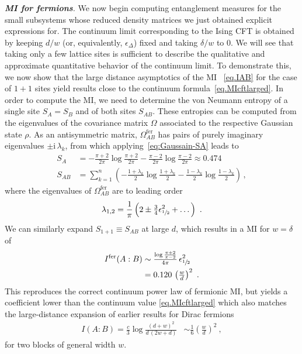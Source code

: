 \documentclass[prl,a4paper,notitlepage,twocolumn,superscriptaddress,longbibliography,reprint]{revtex4-2}
\newcommand{\ii}{\mathrm{i}}
\newcommand{\mysection}[1]{{\vspace{10 pt}\noindent \emph{{\textbf{#1}}.}}}
\begin{document}
\mysection{MI for fermions}
We now begin computing entanglement measures for the small subsystems whose reduced density matrices we just obtained explicit expressions for.
The continuum limit corresponding to the Ising CFT is obtained by keeping $d/w$ (or, equivalently, $\epsilon_\Delta$) fixed and taking $\delta/w$ to $0$. We will see that taking only a few lattice sites is sufficient to describe the qualitative and approximate quantitative behavior of the continuum limit.
To demonstrate this, we now show that the large distance asymptotics of the MI ~\eqref{eq.IAB} for the case of $1+1$ sites yield results close to the continuum formula~\eqref{eq.MIcftlarged}. 
In order to compute the MI, we need to determine the von Neumann entropy of a single site $S_A=S_B$ and of both sites $S_{AB}$. These entropies can be computed from the eigenvalues of the covariance matrix $\Omega$ associated to the respective Gaussian state $\rho$. As an antisymmetric matrix, $\Omega^{\mathrm{fer}}_{AB}$  has pairs of purely imaginary eigenvalues $\pm \ii\, \lambda_k$, from which applying~\eqref{eq:Gaussain-SA} leads to
\begin{align}
S_A&=- \tfrac{\pi+2}{2\pi}\log\tfrac{\pi+2}{2\pi} - \tfrac{\pi-2}{2\pi}\log\tfrac{\pi-2}{2\pi} \approx 0.474\\
    S_{AB} &=\sum_{k=1}^n \left( - \tfrac{1+\lambda_k}{2}\log\tfrac{1+\lambda_k}{2} - \tfrac{1-\lambda_k}{2}\log\tfrac{1-\lambda_k}{2} \right)\,,\label{eq:Gaussian-SAB}
\end{align}
where the eigenvalues of $\Omega_{AB}^{\mathrm{fer}}$ are to leading order
\begin{equation}
    \lambda_{1,2} = \frac{1}{\pi} \left( 2 \pm \tfrac{3}{4}\epsilon_{\sfrac{1}{2}}^2  + \dots \right) \ . 
\end{equation}
We can similarly expand $S_{1+1} \equiv S_{AB}$ at large $d$, which results in a MI for $w=\delta$ of
\begin{align}\label{eq:MIFerm11}
    I^{\mathrm{fer}}(A:B)&\sim \tfrac{\log\frac{\pi+2}{\pi-2}}{4\pi}\,\epsilon_{\sfrac{1}{2}}^2 \nonumber\\
    &= 0.120 \,\left(\tfrac{w}{d}\right)^2 \ .
\end{align}
This reproduces the correct continuum power law of fermionic MI, but yields a coefficient lower than the continuum value \eqref{eq.MIcftlarged} which also matches the large-distance expansion of earlier results for Dirac fermions~\cite{Casini:2005rm}
\begin{align}\label{eq:MIFerm}
    I(A:B)=\frac{c}{3}\log\frac{(d+w)^2}{d\,(2w+d)} &\sim \frac{1}{6} \left(\frac{w}{d}\right)^2 \ ,
\end{align}
for two blocks of general width $w$.
\end{document}

